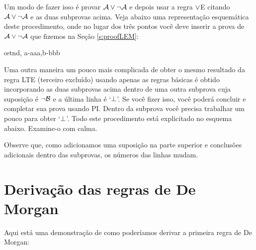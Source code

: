 Um modo de fazer isso é provar $\mathcal{A} \vee \neg\mathcal{A}$ e depois usar a regra $\vee$E citando $\mathcal{A} \vee \neg\mathcal{A}$ e as duas subprovas acima. Veja abaixo uma representação esquemática deste procedimento, onde no lugar dos três pontos você deve inserir a prova de $\mathcal{A} \vee \neg\mathcal{A}$ que fizemos na Seção \ref{s:proofLEM}:

\begin{fitchproof}
  \open
  \close
  \open
  \close
  \ellipsesline
  \oe{tnd, a-aaa,b-bbb}
\end{fitchproof}

 


Uma outra maneira um pouco mais complicada de obter o mesmo resultado da regra LTE (terceiro excluído) usando apenas as regras básicas é obtido incorporando as duas subprovas acima dentro de uma outra subprova cuja suposição é $\neg \mathcal{B}$ e a última linha é `$\bot$'. Se você fizer isso, você poderá concluir  e completar sua prova usando PI. Dentro da subprova você precisa trabalhar um pouco para obter `$\bot$'. Todo este procedimento está explicitado no esquema abaixo. Examine-o com calma.

\begin{fitchproof}
  \open
  \open
  \ellipsesline
  \close
  \open
  \ellipsesline
  \close
  \close
\end{fitchproof}
Observe que, como adicionamos uma suposição na parte superior e conclusões adicionais dentro das subprovas, os números das linhas mudam.

\section{Derivação das regras de De Morgan}
Aqui está uma demonstração de como poderíamos derivar a primeira regra de De Morgan:
 
